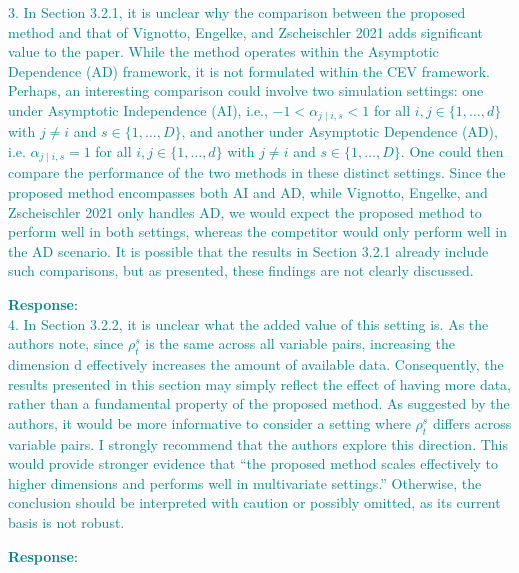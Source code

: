 \documentclass[a4paper,12pt]{article}
\begin{document}

\noindent \textcolor{teal}{
3. In Section 3.2.1, it is unclear why the comparison between the proposed method and that of
Vignotto, Engelke, and Zscheischler 2021 adds significant value to the paper. 
While the method operates within the Asymptotic Dependence (AD) framework, it is not formulated within the CEV framework. 
Perhaps, an interesting comparison could involve two simulation settings: one under Asymptotic Independence (AI), i.e., $-1 < \alpha_{j \mid i, s} < 1$ for all $i, j \in \{1, \ldots, d\}$ with $j \ne i$ and $s \in \{1, \ldots, D\}$, and another under Asymptotic Dependence (AD), i.e. $\alpha_{j \mid i, s} = 1$ for all $i, j \in \{1, \ldots, d\}$ with $j \ne i$ and $s \in \{1, \ldots, D\}$. 
One could then compare the performance of the two methods in these distinct settings. 
Since the proposed method encompasses both AI and AD, while Vignotto, Engelke, and Zscheischler 2021 only handles AD, we would expect the proposed method to perform well in both settings, whereas the competitor would only perform well in the AD scenario. 
It is possible that the results in Section 3.2.1 already include such comparisons, but as presented, these findings are not clearly discussed.
}

\noindent \textcolor{teal}{\bf Response}: \\


\noindent \textcolor{teal}{
4. In Section 3.2.2, it is unclear what the added value of this setting is. 
As the authors note,
since $\rho^{s}_t$ is the same across all variable pairs, increasing the dimension d effectively increases the amount of available data. 
Consequently, the results presented in this section may simply reflect the effect of having more data, rather than a fundamental property of the proposed method. 
As suggested by the authors, it would be more informative to consider a setting where 
$\rho^{s}_t$ differs across variable pairs. 
I strongly recommend that the authors explore this direction. 
This would provide stronger evidence that ``the proposed method scales effectively to higher dimensions and performs well in multivariate settings.'' 
Otherwise, the conclusion should be interpreted with caution or possibly omitted, as its current basis is not robust.
}

\noindent \textcolor{teal}{\bf Response}: \\
\end{document}
